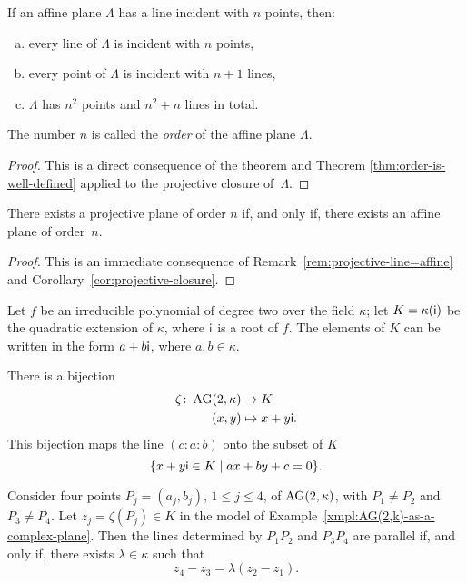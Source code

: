 \begin{cor}\label{cor:projective-closure}
    If an affine plane\/ $\Lambda$ has a line incident with\/ $n$ points, then:
    \begin{enumerate}[a), font=\upshape]
        \item every line of\/ $\Lambda$ is incident with\/ $n$ points,
        \item every point of\/ $\Lambda$ is incident with\/ $n + 1$ lines,
        \item $\Lambda$ has\/ $n^2$ points and\/ $n^2 + n$ lines in total.
    \end{enumerate}
    The number\/ $n$ is called the \textsl{order} of the affine plane\/ $\Lambda$.
\end{cor}

\begin{proof}
    This is a direct consequence of the theorem and Theorem \ref{thm:order-is-well-defined} applied to the projective closure of~$\Lambda$.
    
\end{proof}

\begin{thm}
    There exists a projective plane of order\/ $n$ if, and only if, there exists an affine plane of order\/~$n$.
\end{thm}

\begin{proof}
    This is an immediate consequence of Remark~\ref{rem:projective-line=affine} and Corollary~\ref{cor:projective-closure}.
    
\end{proof}

\begin{xmpl}\label{xmpl:AG(2,k)-as-a-complex-plane}
    Let $f$ be an irreducible polynomial of degree two over the field $\kappa$; let $K = \kappa(\mathsf{i})$ be the quadratic extension of $\kappa$, where $\mathsf{i}$ is a root of $f$.  
    The elements of $K$ can be written in the form $a + b\mathsf{i}$, where $a, b \in \kappa$.
    
    There is a bijection
    \begin{align*}
        \zeta\colon\operatorname{AG}(2,\kappa)&\to K\\
        (x,y)&\mapsto x+y\mathsf{i}.
    \end{align*}
    This bijection maps the line $(c:a:b)$ onto the subset of $K$
    \[
        \{x+y\mathsf{i} \in K\mid ax+by+c= 0\}.
    \]  
\end{xmpl}


\begin{thm}
    Consider four points\/ $P_j = (a_j, b_j)$, $1\le j\le 4$, of\/ $\operatorname{AG}(2, \kappa)$, with $P_1\ne P_2$ and $P_3\ne P_4$. Let\/ $z_j=\zeta(P_j) \in K$ in the model of\/ {\upshape Example~\ref{xmpl:AG(2,k)-as-a-complex-plane}}. Then the lines determined by\/ $P_1P_2$ and\/ $P_3P_4$ are parallel if, and only if, there exists\/ $\lambda \in \kappa$ such that
    \[
        z_4 - z_3 = \lambda(z_2 - z_1).
    \]
\end{thm}

